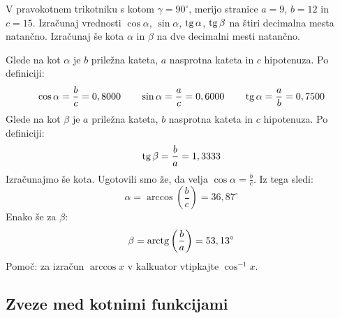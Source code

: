 \begin{zgled}
V pravokotnem trikotniku s kotom $\gamma= 90^{\circ}$, merijo stranice $a=9$, $b=12$ in $c=15$. Izračunaj vrednosti $\cos\alpha$, $\sin\alpha$, $\operatorname{tg}\alpha$, $\operatorname{tg}\beta$ na štiri decimalna mesta natančno. Izračunaj še kota $\alpha$ in $\beta$ na dve decimalni mesti natančno.
\end{zgled}

\begin{resitev}
Glede na kot $\alpha$ je $b$ priležna kateta, $a$ nasprotna kateta in $c$ hipotenuza. Po definiciji:
\begin{equation*}
\cos\alpha= \frac{b}{c}= 0,8000 \quad \quad
\sin\alpha = \frac{a}{c}= 0,6000 \quad \quad
\operatorname{tg} \alpha= \frac{a}{b}= 0,7500
\end{equation*}
Glede na kot $\beta$ je $a$ priležna kateta, $b$ nasprotna kateta in $c$ hipotenuza. Po definiciji:
\begin{equation*}
\operatorname{tg}\beta= \frac{b}{a}= 1,3333 
\end{equation*}
Izračunajmo še kota. Ugotovili smo že, da velja $\cos\alpha= \frac{b}{c}$. Iz tega sledi:
\begin{equation*}
\alpha= \arccos \left(\frac{b}{c}\right) = 36,87^{\circ}
\end{equation*}
Enako še za $\beta$:
\begin{equation*}
\beta= \operatorname{arctg} \left(\frac{b}{a}\right) = 53,13^{\circ}
\end{equation*}
Pomoč: za izračun $\arccos x$ v kalkuator vtipkajte $\cos^{-1}x$.
\end{resitev}

\subsection{Zveze med kotnimi funkcijami}

